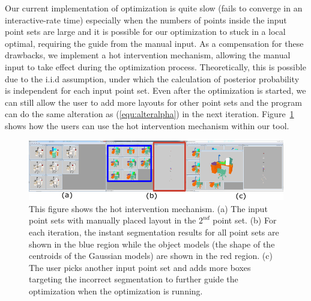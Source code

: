 %
Our current implementation of optimization is quite slow (fails to converge in an interactive-rate time) especially when the numbers of points inside the input point sets are large and it is possible for our optimization to stuck in a local optimal, requiring the guide from the manual input. 
%
As a compensation for these drawbacks, we implement a hot intervention mechanism, allowing the manual input to take effect during the optimization process. 
Theoretically, this is possible due to the i.i.d assumption, under which the calculation of posterior probability is independent for each input point set. 
%
Even after the optimization is started, we can still allow the user to add more layouts  for other point sets and the program can do the same alteration as (\ref{equ:alteralpha}) in the next iteration. 
%
Figure~\ref{fig:hi} shows how the users can use the hot intervention mechanism within our tool.
%
\begin{figure}[htb]
	\centering
	\includegraphics[width=\linewidth]{images/hotintervention/hi}
	\caption{\label{fig:hi} This figure shows the hot intervention mechanism. (a) The input point sets with manually placed layout in the $2^{nd}$ point set. (b) For each iteration, the instant segmentation results for all point sets are shown in the blue region while the object models (the shape of the centroids of the Gaussian models) are shown in the red region. (c) The user picks another input point set and adds more boxes targeting the incorrect segmentation to further guide the optimization when the optimization is running. }
\end{figure}

